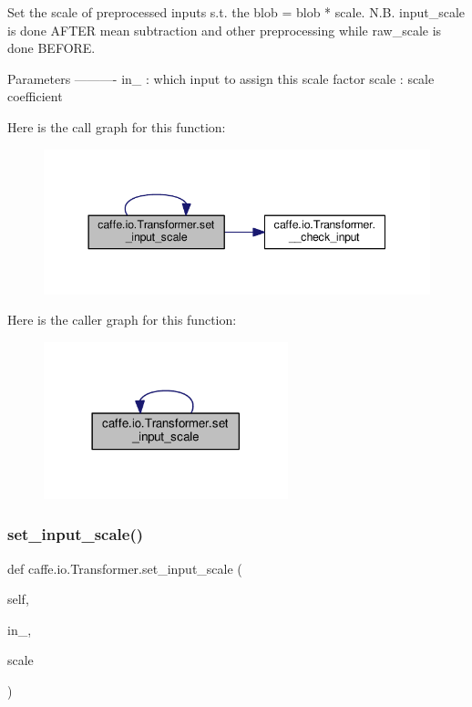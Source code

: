 \begin{DoxyVerb}Set the scale of preprocessed inputs s.t. the blob = blob * scale.
N.B. input_scale is done AFTER mean subtraction and other preprocessing
while raw_scale is done BEFORE.

Parameters
----------
in_ : which input to assign this scale factor
scale : scale coefficient
\end{DoxyVerb}
 Here is the call graph for this function\+:
\nopagebreak
\begin{figure}[H]
\begin{center}
\leavevmode
\includegraphics[width=344pt]{classcaffe_1_1io_1_1_transformer_ab3d72541298e2fb73a884df37e56f65c_cgraph}
\end{center}
\end{figure}
Here is the caller graph for this function\+:
\nopagebreak
\begin{figure}[H]
\begin{center}
\leavevmode
\includegraphics[width=201pt]{classcaffe_1_1io_1_1_transformer_ab3d72541298e2fb73a884df37e56f65c_icgraph}
\end{center}
\end{figure}
\mbox{\label{classcaffe_1_1io_1_1_transformer_ab3d72541298e2fb73a884df37e56f65c}} 
\subsubsection{\texorpdfstring{set\+\_\+input\+\_\+scale()}{set\_input\_scale()}\hspace{0.1cm}{\footnotesize\ttfamily [2/2]}}
{\footnotesize\ttfamily def caffe.\+io.\+Transformer.\+set\+\_\+input\+\_\+scale (\begin{DoxyParamCaption}\item[{}]{self,  }\item[{}]{in\+\_\+,  }\item[{}]{scale }\end{DoxyParamCaption})}

